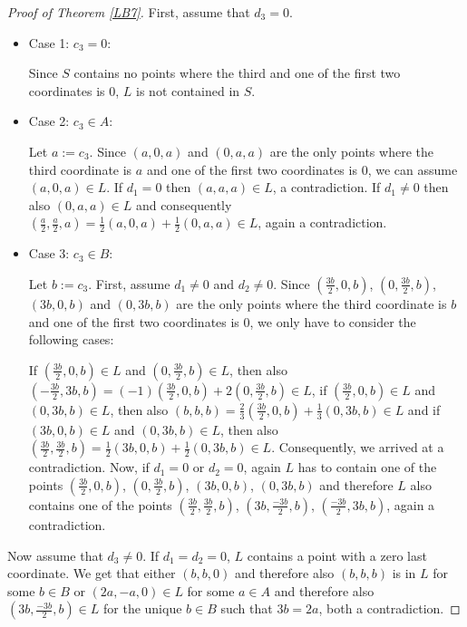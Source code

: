 \documentclass[12pt]{amsart}
\newcommand{\<}{\langle}
\renewcommand{\>}{\rangle}
\numberwithin{equation}{section}
\numberwithin{theorem}{section}
\begin{document}
\begin{proof}[Proof of Theorem \ref{LB7}]
First, assume that $d_3=0$. 
\begin{itemize}
\item Case 1: $c_3=0$:

\noindent
Since $S$ contains no points where the third and one of the first two coordinates is $0$, $L$ is not contained in $S$.

\smallskip
\item Case 2: $c_3\in A$:

\noindent
Let $a:=c_3$. Since $(a, 0, a)$  and $(0,a,a)$ are the only points where the third coordinate is $a$ and one of the first two coordinates is $0$, we can assume $(a, 0, a)\in L$. If $d_1=0$ then $(a,a,a)\in L$, a contradiction. If $d_1\neq 0$ then also $(0,a,a)\in L$ and consequently $(\frac{a}{2},\frac{a}{2},a)=\frac{1}{2}(a, 0, a)+\frac{1}{2}(0,a,a)\in L$, again a contradiction.

\smallskip
\item Case 3: $c_3\in B$: 

\noindent
Let $b:=c_3$. First, assume $d_1\neq0$ and $d_2\neq0$. Since  $(\frac{3b}{2}, 0, b)$, $(0, \frac{3b}{2}, b)$, $(3b, 0, b)$  and $(0,3b,b)$ are the only points where the third coordinate is $b$ and one of the first two coordinates is $0$, we only have to consider the following cases:

If $(\frac{3b}{2}, 0, b)\in L$ and $(0, \frac{3b}{2}, b)\in L$, then also $(-\frac{3b}{2},3b , b)=(-1)(\frac{3b}{2}, 0, b)+2(0, \frac{3b}{2}, b)\in L$, if  $(\frac{3b}{2}, 0, b)\in L$ and $(0,3b,b)\in L$, then also $(b,b , b)=\frac{2}{3}(\frac{3b}{2}, 0, b)+\frac{1}{3}(0, 3b, b)\in L$ and if $(3b, 0, b)\in L$ and $(0,3b,b)\in L$, then also $(\frac{3b}{2},\frac{3b}{2}, b)=\frac{1}{2}(3b, 0, b)+\frac{1}{2}(0, 3b, b)\in L$. Consequently, we arrived at a contradiction.
Now, if $d_1=0$ or $d_2=0$, again $L$ has to contain one of the points $(\frac{3b}{2}, 0, b)$, $(0, \frac{3b}{2}, b)$, $(3b, 0, b)$, $(0,3b,b)$ and therefore $L$ also contains one of the points $(\frac{3b}{2},\frac{3b}{2},b)$, $(3b,\frac{-3b}{2},b)$, $(\frac{-3b}{2},3b,b)$, again a contradiction.


\end{itemize}



Now assume that $d_3\neq0$. If $d_1=d_2=0$, $L$ contains a point with a zero last coordinate. We get that either $(b,b,0)$ and therefore also $(b,b,b)$ is in $L$ for some $b\in B$ or $(2a,-a,0)\in L$ for some $a\in A$ and therefore also $(3b,\frac{-3b}{2},b)\in L$ for the unique $b\in B$ such that $3b=2a$, both a contradiction.




\end{proof}
\end{document}
